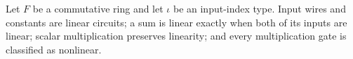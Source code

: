 \begin{definition}
\label{TCSlib.MPC.Circuit.IsLinear}
\leanok
{}
Let $F$ be a commutative ring and let $\iota$ be an input-index type. Input wires and
constants are linear circuits; a sum is linear exactly when both of its inputs are
linear; scalar multiplication preserves linearity; and every multiplication gate is
classified as nonlinear.
\end{definition}
